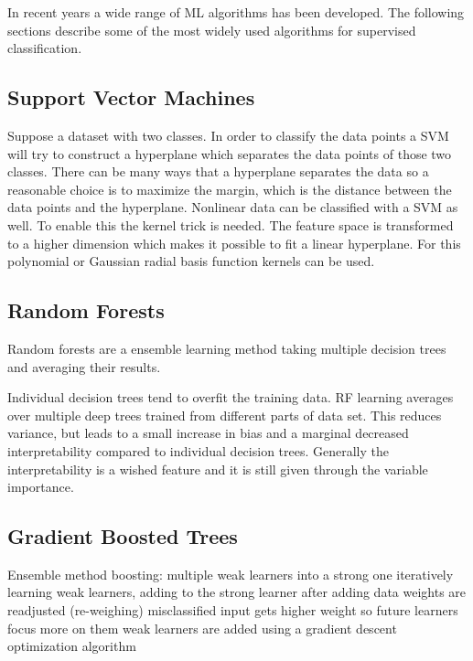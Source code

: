 In recent years a wide range of ML algorithms has been developed. The following sections describe some of the most widely used algorithms for supervised classification.

	\subsection{Support Vector Machines}
Suppose a dataset with two classes. In order to classify the data points a SVM will try to construct a hyperplane which separates the data points of those two classes. 
There can be many ways that a hyperplane separates the data so a reasonable choice is to maximize the margin, which is the distance between the data points and the hyperplane. %
Nonlinear data can be classified with a SVM as well. To enable this the kernel trick is needed. The feature space is transformed to a higher dimension which makes it possible to fit a linear hyperplane. For this polynomial or Gaussian radial basis function kernels can be used.


 
	\subsection{Random Forests}
Random forests are a ensemble learning method taking multiple decision trees and averaging their results.


Individual decision trees tend to overfit the training data. RF learning averages over multiple deep trees trained from different parts of data set. This reduces variance, but leads to a small increase in bias and a marginal decreased interpretability compared to individual decision trees. Generally the interpretability is a wished feature and it is still given through the variable importance.



	\subsection{Gradient Boosted Trees}
Ensemble method
boosting: multiple weak learners into a strong one
iteratively learning weak learners, adding to the strong learner after adding data weights are readjusted (re-weighing) misclassified input gets higher weight so future learners focus more on them
weak learners are added using a gradient descent optimization algorithm


